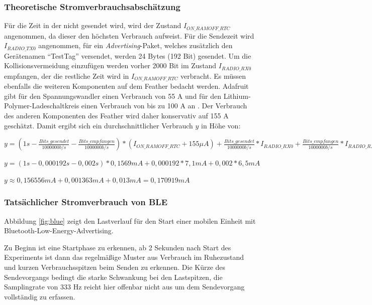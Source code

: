 \subsubsection{Theoretische Stromverbrauchsabschätzung}
Für die Zeit in der nicht gesendet wird, wird der Zustand $I_{ON\_RAMOFF\_RTC}$ angenommen, da dieser den höchsten Verbrauch aufweist.
Für die Sendezeit wird $I_{RADIO\_TX0}$ angenommen, für ein \emph{Advertising}-Paket, welches zusätzlich den Gerätenamen "`TestTag"' versendet, werden 24 Bytes (192 Bit) gesendet.
Um die Kollisionsvermeidung einzufügen werden vorher 2000 Bit im Zustand $I_{RADIO\_RX0}$ empfangen, der die restliche Zeit wird in $I_{ON\_RAMOFF\_RTC}$ verbracht. 
Es müssen ebenfalls die weiteren Komponenten auf dem Feather bedacht werden. 
Adafruit gibt für den Spannungswandler einen Verbrauch von 55 \textmu A und für den Lithium-Polymer-Ladeschaltkreis einen Verbrauch von bis zu 100 \textmu A an \cite{fried2016lora}. 
Der Verbrauch des anderen Komponenten des Feather wird daher konservativ auf 155 \textmu A geschätzt.
Damit ergibt sich ein durchschnittlicher Verbrauch $y$ in Höhe von: 

$y = (1s-\frac{Bits\_gesendet}{1000000 b/s} - \frac{Bits\_empfangen}{1000000 b/s}) * (I_{ON\_RAMOFF\_RTC} + 155 {\mu}A) + \frac{Bits\_gesendet}{1000000 b/s} * I_{RADIO\_RX0} + \frac{Bits\_empfangen}{1000000 b/s} * I_{RADIO\_RX0}$

$y = (1s - 0,000192s - 0,002s) * 0,1569mA + 0,000192 * 7,1mA + 0,002 * 6,5mA$

$y \approx 0,156556mA + 0,001363mA + 0,013mA = 0,170919mA$ 

\subsubsection{Tatsächlicher Stromverbrauch von BLE}
\label{ch:phase3:sec:powerble}
Abbildung \ref{fig:blue} zeigt den Lastverlauf für den Start einer mobilen Einheit mit Bluetooth-Low-Energy-Advertising.

Zu Beginn ist eine Startphase zu erkennen, ab 2 Sekunden nach Start des Experiments ist dann das regelmäßige Muster aus Verbrauch im Ruhezustand und kurzen Verbrauchsspitzen beim Senden zu erkennen.
Die Kürze des Sendevorgangs bedingt die starke Schwankung bei den Lastspitzen, die Samplingrate von 333 Hz reicht hier offenbar nicht aus um dem Sendevorgang vollständig zu erfassen.

